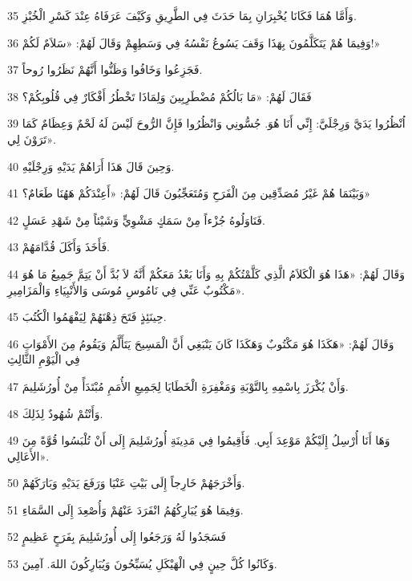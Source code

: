 \par 35 وَأَمَّا هُمَا فَكَانَا يُخْبِرَانِ بِمَا حَدَثَ فِي الطَّرِيقِ وَكَيْفَ عَرَفَاهُ عِنْدَ كَسْرِ الْخُبْزِ.
\par 36 وَفِيمَا هُمْ يَتَكَلَّمُونَ بِهَذَا وَقَفَ يَسُوعُ نَفْسُهُ فِي وَسَطِهِمْ وَقَالَ لَهُمْ: «سَلاَمٌ لَكُمْ!»
\par 37 فَجَزِعُوا وَخَافُوا وَظَنُّوا أَنَّهُمْ نَظَرُوا رُوحاً.
\par 38 فَقَالَ لَهُمْ: «مَا بَالُكُمْ مُضْطَرِبِينَ وَلِمَاذَا تَخْطُرُ أَفْكَارٌ فِي قُلُوبِكُمْ؟
\par 39 اُنْظُرُوا يَدَيَّ وَرِجْلَيَّ: إِنِّي أَنَا هُوَ. جُسُّونِي وَانْظُرُوا فَإِنَّ الرُّوحَ لَيْسَ لَهُ لَحْمٌ وَعِظَامٌ كَمَا تَرَوْنَ لِي».
\par 40 وَحِينَ قَالَ هَذَا أَرَاهُمْ يَدَيْهِ وَرِجْلَيْهِ.
\par 41 وَبَيْنَمَا هُمْ غَيْرُ مُصَدِّقِين مِنَ الْفَرَحِ وَمُتَعَجِّبُونَ قَالَ لَهُمْ: «أَعِنْدَكُمْ هَهُنَا طَعَامٌ؟»
\par 42 فَنَاوَلُوهُ جُزْءاً مِنْ سَمَكٍ مَشْوِيٍّ وَشَيْئاً مِنْ شَهْدِ عَسَلٍ.
\par 43 فَأَخَذَ وَأَكَلَ قُدَّامَهُمْ.
\par 44 وَقَالَ لَهُمْ: «هَذَا هُوَ الْكَلاَمُ الَّذِي كَلَّمْتُكُمْ بِهِ وَأَنَا بَعْدُ مَعَكُمْ أَنَّهُ لاَ بُدَّ أَنْ يَتِمَّ جَمِيعُ مَا هُوَ مَكْتُوبٌ عَنِّي فِي نَامُوسِ مُوسَى وَالأَنْبِيَاءِ وَالْمَزَامِيرِ».
\par 45 حِينَئِذٍ فَتَحَ ذِهْنَهُمْ لِيَفْهَمُوا الْكُتُبَ.
\par 46 وَقَالَ لَهُمْ: «هَكَذَا هُوَ مَكْتُوبٌ وَهَكَذَا كَانَ يَنْبَغِي أَنَّ الْمَسِيحَ يَتَأَلَّمُ وَيَقُومُ مِنَ الأَمْوَاتِ فِي الْيَوْمِ الثَّالِثِ
\par 47 وَأَنْ يُكْرَزَ بِاسْمِهِ بِالتَّوْبَةِ وَمَغْفِرَةِ الْخَطَايَا لِجَمِيعِ الأُمَمِ مُبْتَدَأً مِنْ أُورُشَلِيمَ.
\par 48 وَأَنْتُمْ شُهُودٌ لِذَلِكَ.
\par 49 وَهَا أَنَا أُرْسِلُ إِلَيْكُمْ مَوْعِدَ أَبِي. فَأَقِيمُوا فِي مَدِينَةِ أُورُشَلِيمَ إِلَى أَنْ تُلْبَسُوا قُوَّةً مِنَ الأَعَالِي».
\par 50 وَأَخْرَجَهُمْ خَارِجاً إِلَى بَيْتِ عَنْيَا وَرَفَعَ يَدَيْهِ وَبَارَكَهُمْ.
\par 51 وَفِيمَا هُوَ يُبَارِكُهُمُ انْفَرَدَ عَنْهُمْ وَأُصْعِدَ إِلَى السَّمَاءِ.
\par 52 فَسَجَدُوا لَهُ وَرَجَعُوا إِلَى أُورُشَلِيمَ بِفَرَحٍ عَظِيمٍ
\par 53 وَكَانُوا كُلَّ حِينٍ فِي الْهَيْكَلِ يُسَبِّحُونَ وَيُبَارِكُونَ اللهَ. آمِينَ.


